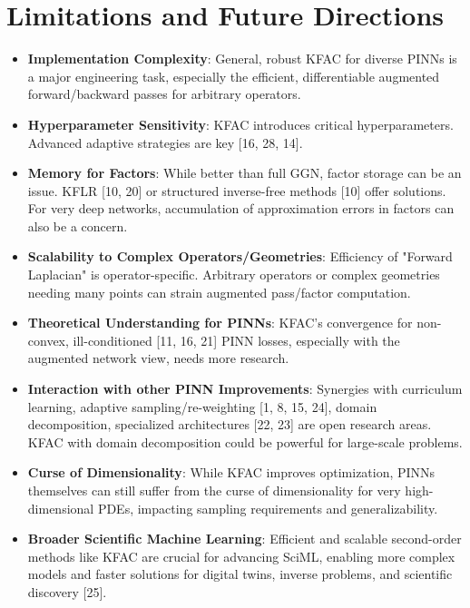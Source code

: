 \documentclass[12pt,a4paper]{article}
\begin{document}
\section{Limitations and Future Directions}
\begin{itemize}[nosep,leftmargin=*]
    \item \textbf{Implementation Complexity}: General, robust KFAC for diverse PINNs is a major engineering task, especially the efficient, differentiable augmented forward/backward passes for arbitrary operators.
    \item \textbf{Hyperparameter Sensitivity}: KFAC introduces critical hyperparameters. Advanced adaptive strategies are key [16, 28, 14].
    \item \textbf{Memory for Factors}: While better than full GGN, factor storage can be an issue. KFLR [10, 20] or structured inverse-free methods [10] offer solutions. For very deep networks, accumulation of approximation errors in factors can also be a concern.
    \item \textbf{Scalability to Complex Operators/Geometries}: Efficiency of "Forward Laplacian" is operator-specific. Arbitrary operators or complex geometries needing many points can strain augmented pass/factor computation.
    \item \textbf{Theoretical Understanding for PINNs}: KFAC's convergence for non-convex, ill-conditioned [11, 16, 21] PINN losses, especially with the augmented network view, needs more research.
    \item \textbf{Interaction with other PINN Improvements}: Synergies with curriculum learning, adaptive sampling/re-weighting [1, 8, 15, 24], domain decomposition, specialized architectures [22, 23] are open research areas. KFAC with domain decomposition could be powerful for large-scale problems.
    \item \textbf{Curse of Dimensionality}: While KFAC improves optimization, PINNs themselves can still suffer from the curse of dimensionality for very high-dimensional PDEs, impacting sampling requirements and generalizability.
    \item \textbf{Broader Scientific Machine Learning}: Efficient and scalable second-order methods like KFAC are crucial for advancing SciML, enabling more complex models and faster solutions for digital twins, inverse problems, and scientific discovery [25].
\end{itemize}
\end{document}
